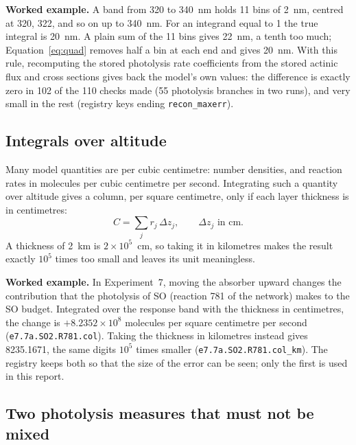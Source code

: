 \textbf{Worked example.} A band from 320 to 340~nm holds 11 bins of 2~nm, centred at
320, 322, and so on up to 340~nm. For an integrand equal to 1 the true integral is 20~nm.
A plain sum of the 11 bins gives 22~nm, a tenth too much; Equation~\eqref{eq:quad}
removes half a bin at each end and gives 20~nm. With this rule, recomputing the stored
photolysis rate coefficients from the stored actinic flux and cross sections gives back
the model's own values: the difference is exactly zero in 102 of the 110 checks made
(55 photolysis branches in two runs), and very small in the rest (registry keys ending
\texttt{recon\_maxerr}).

\subsection{Integrals over altitude}
\label{sec:conv-col}

Many model quantities are per cubic centimetre: number densities, and reaction rates in
molecules per cubic centimetre per second. Integrating such a quantity over altitude
gives a column, per square centimetre, only if each layer thickness is in centimetres:
\begin{equation}
  C = \sum_{j} r_j\,\Delta z_j , \qquad \Delta z_j \text{ in cm} .
  \label{eq:col}
\end{equation}
A thickness of 2~km is $2\times10^{5}$~cm, so taking it in kilometres makes the result
exactly $10^{5}$ times too small and leaves its unit meaningless.

\textbf{Worked example.} In Experiment~7, moving the absorber upward changes the contribution
that the photolysis of SO (reaction 781 of the network) makes to the SO
budget. Integrated over the response band with the thickness in centimetres, the change
is $+8.2352\times10^{8}$ molecules per square centimetre per second
(\texttt{e7.7a.SO2.R781.col}). Taking the thickness in kilometres instead gives
8235.1671, the same digits $10^{5}$ times smaller (\texttt{e7.7a.SO2.R781.col\_km}).
The registry keeps both so that the size of the error can be seen; only the first is
used in this report.

\subsection{Two photolysis measures that must not be mixed}
\label{sec:conv-J}

